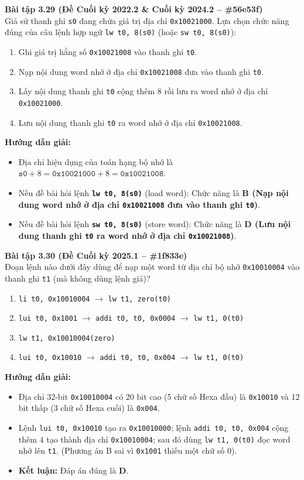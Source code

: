 \textbf{Bài tập 3.29 (Đề Cuối kỳ 2022.2 \& Cuối kỳ 2024.2 -- \#56e53f)}\\
Giả sử thanh ghi \texttt{s0} đang chứa giá trị địa chỉ \texttt{0x10021000}. Lựa chọn chức năng đúng của câu lệnh hợp ngữ \texttt{lw t0, 8(s0)} (hoặc \texttt{sw t0, 8(s0)}):
\begin{enumerate}[label=\Alph*.]
    \item Ghi giá trị hằng số \texttt{0x10021008} vào thanh ghi \texttt{t0}.
    \item Nạp nội dung word nhớ ở địa chỉ \texttt{0x10021008} đưa vào thanh ghi \texttt{t0}.
    \item Lấy nội dung thanh ghi \texttt{t0} cộng thêm 8 rồi lưu ra word nhớ ở địa chỉ \texttt{0x10021000}.
    \item Lưu nội dung thanh ghi \texttt{t0} ra word nhớ ở địa chỉ \texttt{0x10021008}.
\end{enumerate}
\textbf{Hướng dẫn giải:}
\begin{itemize}
    \item Địa chỉ hiệu dụng của toán hạng bộ nhớ là $\texttt{s0} + 8 = \texttt{0x10021000} + 8 = \texttt{0x10021008}$.
    \item Nếu đề bài hỏi lệnh \textbf{\texttt{lw t0, 8(s0)}} (load word): Chức năng là \textbf{B (Nạp nội dung word nhớ ở địa chỉ \texttt{0x10021008} đưa vào thanh ghi \texttt{t0})}.
    \item Nếu đề bài hỏi lệnh \textbf{\texttt{sw t0, 8(s0)}} (store word): Chức năng là \textbf{D (Lưu nội dung thanh ghi \texttt{t0} ra word nhớ ở địa chỉ \texttt{0x10021008})}.
\end{itemize}

\textbf{Bài tập 3.30 (Đề Cuối kỳ 2025.1 -- \#1f833e)}\\
Đoạn lệnh nào dưới đây dùng để nạp một word từ địa chỉ bộ nhớ \texttt{0x10010004} vào thanh ghi \texttt{t1} (mà không dùng lệnh giả)?
\begin{enumerate}[label=\Alph*.]
    \item \texttt{li t0, 0x10010004} $\rightarrow$ \texttt{lw t1, zero(t0)}
    \item \texttt{lui t0, 0x1001} $\rightarrow$ \texttt{addi t0, t0, 0x0004} $\rightarrow$ \texttt{lw t1, 0(t0)}
    \item \texttt{lw t1, 0x10010004(zero)}
    \item \texttt{lui t0, 0x10010} $\rightarrow$ \texttt{addi t0, t0, 0x004} $\rightarrow$ \texttt{lw t1, 0(t0)}
\end{enumerate}
\textbf{Hướng dẫn giải:}
\begin{itemize}
    \item Địa chỉ 32-bit \texttt{0x10010004} có 20 bit cao (5 chữ số Hexa đầu) là \texttt{0x10010} và 12 bit thấp (3 chữ số Hexa cuối) là \texttt{0x004}.
    \item Lệnh \texttt{lui t0, 0x10010} tạo ra \texttt{0x10010000}; lệnh \texttt{addi t0, t0, 0x004} cộng thêm $4$ tạo thành địa chỉ \texttt{0x10010004}; sau đó dùng \texttt{lw t1, 0(t0)} đọc word nhớ lên \texttt{t1}. (Phương án B sai vì \texttt{0x1001} thiếu một chữ số 0).
    \item \textbf{Kết luận:} Đáp án đúng là \textbf{D}.
\end{itemize}

